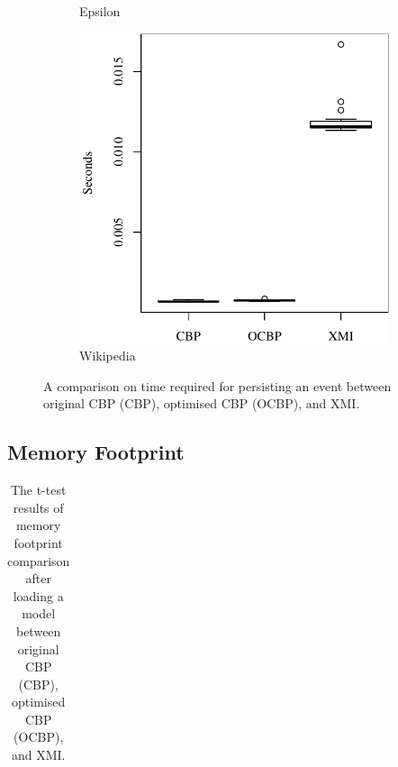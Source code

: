 {\begin{figure}[ht]
\begin{subfigure}{0.325\textwidth}
\caption{Epsilon}
\label{fig:save_time_epsilon}
\end{subfigure}
\hfill
\begin{subfigure}{0.325\textwidth}
\centering
\includegraphics[width=\linewidth]{images/ol_save_time_wikipedia}
\caption{Wikipedia}
\label{fig:save_time_wikipedia}
\end{subfigure}
\caption{A comparison on time required for persisting an event between original CBP (CBP), optimised CBP (OCBP), and XMI.}
\label{fig:savetime}
\end{figure}


\subsection{Memory Footprint}
\label{subsec:memory_consumption}

\begin{table}[t]
\footnotesize
\centering
\caption{The t-test results of memory footprint comparison after loading a model between original CBP (CBP), optimised CBP (OCBP), and XMI.}
\label{table:ttest_results_load_memory}
\begin{tabular}
{|p{}p{}p{}|p{}p{}p{}p{}|}
\hline 


\end{tabular}
\end{table}}
